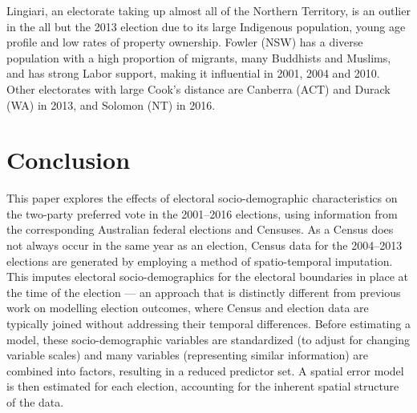 \documentclass[times, doublespace]{anzsauth}
\begin{document}
Lingiari, an electorate taking up almost all of the Northern Territory, is an outlier in the all but the 2013 election due to its large Indigenous population, young age profile and low rates of property ownership. Fowler (NSW) has a diverse population with a high proportion of migrants, many Buddhists and Muslims, and has strong Labor support, making it influential in 2001, 2004 and 2010. Other electorates with large Cook's distance are Canberra (ACT) and Durack (WA) in 2013, and Solomon (NT) in 2016.

\hypertarget{conclusion}{%
\section{Conclusion}\label{conclusion}}

This paper explores the effects of electoral socio-demographic characteristics on the two-party preferred vote in the 2001--2016 elections, using information from the corresponding Australian federal elections and Censuses. As a Census does not always occur in the same year as an election, Census data for the 2004--2013 elections are generated by employing a method of spatio-temporal imputation. This imputes electoral socio-demographics for the electoral boundaries in place at the time of the election --- an approach that is distinctly different from previous work on modelling election outcomes, where Census and election data are typically joined without addressing their temporal differences. Before estimating a model, these socio-demographic variables are standardized (to adjust for changing variable scales) and many variables (representing similar information) are combined into factors, resulting in a reduced predictor set. A spatial error model is then estimated for each election, accounting for the inherent spatial structure of the data.
\end{document}
